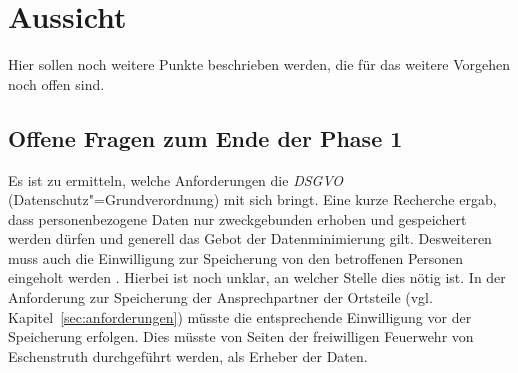 \section{Aussicht}\label{sec:Aussicht}

Hier sollen noch weitere Punkte beschrieben werden, die für das weitere Vorgehen noch offen sind.

\subsection{Offene Fragen zum Ende der Phase 1}

Es ist zu ermitteln, welche Anforderungen die \textit{DSGVO} (Datenschutz"=Grundverordnung) mit sich bringt. Eine kurze Recherche ergab, dass personenbezogene Daten nur zweckgebunden erhoben und gespeichert werden dürfen und generell das Gebot der Datenminimierung gilt. Desweiteren muss auch die Einwilligung zur Speicherung von den betroffenen Personen eingeholt werden \citep[vgl.][]{heiseDSGVO}. Hierbei ist noch unklar, an welcher Stelle dies nötig ist. In der Anforderung zur Speicherung der Ansprechpartner der Ortsteile (vgl. Kapitel~\ref{sec:anforderungen}) müsste die entsprechende Einwilligung vor der Speicherung erfolgen. Dies müsste von Seiten der freiwilligen Feuerwehr von Eschenstruth durchgeführt werden, als Erheber der Daten.



\newpage